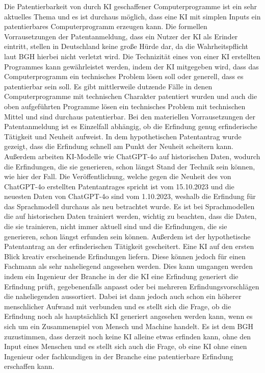 Die Patentierbarkeit von durch KI 
geschaffener Computerprogramme ist ein sehr aktuelles Thema 
und es ist durchaus möglich, dass eine KI mit simplen
Inputs ein patentierbares Computerprogramm erzeugen kann.
Die formellen Vorrausetzungen der Patentanmeldung, 
dass ein Nutzer der KI als
Erinder eintritt, stellen in Deutschland keine große Hürde
dar, da die Wahrheitspflicht laut BGH hierbei
nicht verletzt wird. Die Technizität eines von einer
KI erstellten Programmes 
kann gewährleistet werden, 
indem der KI mitgegeben wird, dass das 
Computerprogramm ein technisches Problem lösen 
soll oder generell, dass es patentierbar sein soll.
Es gibt mittlerweile dutzende Fälle in denen 
Computerprogramme mit technischen Charakter patentiert wurden
und auch die oben aufgeführten Programme lösen
ein technisches Problem mit technischen Mittel und
sind durchaus patentierbar. Bei den materiellen
Vorrausetzungen der Patentanmeldung ist es Einzelfall
abhängig, ob die Erfindung genug erfinderische Tätigkeit
und Neuheit aufweist. In dem hypothetischen
Patentantrag wurde gezeigt, dass die Erfindung
schnell am Punkt der Neuheit scheitern kann.
Außerdem arbeiten KI-Modelle wie ChatGPT-4o auf historischen Daten,
wodurch die Erfindungen, die sie generieren, schon längst 
Stand der Technik sein können, wie hier der Fall.
Die Veröffentlichung, welche gegen die Neuheit des von ChatGPT-4o
erstellten Patentantrages spricht ist vom 15.10.2023 und die neuesten 
Daten von ChatGPT-4o sind vom 1.10.2023, weshalb die Erfindung
für das Sprachmodell durchaus als neu betrachtet wurde.
Es ist bei Sprachmodellen die auf historischen
Daten trainiert werden, wichtig zu beachten, dass
die Daten, die sie trainieren, nicht immer aktuell sind
und die Erfindungen, die sie generieren, schon längst
erfunden sein können.
Außerdem ist der hypothetische Patentantrag an der erfinderischen Tätigkeit gescheitert.
Eine KI auf den ersten Blick kreativ erscheinende
Erfindungen liefern. Diese können jedoch für einen Fachmann
als sehr naheliegend angesehen werden.
Dies kann umgangen werden indem ein Ingenieur der 
Branche in der die KI eine Erfindung generiert die 
Erfindung prüft, gegebenenfalls anpasst oder bei
mehreren Erfindungsvorschlägen die naheliegenden aussortiert. Dabei ist 
dann jedoch auch schon ein höherer menschlicher 
Aufwand mit verbunden und es stellt sich die Frage,
ob die Erfindung noch als hauptsächlich KI generiert angesehen werden
kann, wenn es sich um ein Zusammenspiel von Mensch
und Machine handelt. Es ist dem BGH zuzustimmen, 
dass derzeit noch keine KI alleine etwas erfinden kann,
ohne den Input eines Menschen und es stellt sich
auch die Frage, ob eine KI ohne einen Ingenieur
oder fachkundigen in der Branche eine patentierbare
Erfindung erschaffen kann.
